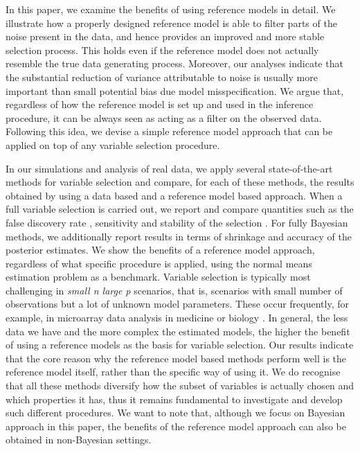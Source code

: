 \documentclass[american,]{article}
\theoremstyle{definition}
\begin{document}
In this paper, we examine the benefits of using reference
models in detail. We illustrate how a properly designed reference model is able 
to filter parts of the noise present in the data, and hence provides an improved and more
stable selection process. This holds even if the reference model does not actually resemble the
true data generating process. Moreover, our analyses indicate that the substantial reduction of
variance attributable to noise is usually
more important than small potential bias due model misspecification.
We argue that, regardless of how the reference model is set up and used in the
inference procedure, it can be always seen as acting as a filter on the observed 
data. Following this idea, we devise a simple reference model approach that can
be applied on top of any variable selection procedure. 

In our simulations and analysis of real data, we apply several state-of-the-art methods for variable selection and compare,
for each of these methods, the results obtained by using a data based and a
reference model based approach. When a full 
variable selection is carried out, we report and compare quantities such as 
the false discovery rate \citep{paper:fdr_BH}, sensitivity and stability of the selection \citep{paper:stability}. For fully Bayesian methods, we additionally report results in terms of shrinkage and accuracy of the posterior estimates.
We show the benefits
of a reference model approach, regardless of what specific procedure is applied, using 
the normal means estimation problem as a benchmark. 
Variable selection is typically most challenging in 
\textit{small n large p} scenarios, that is, scenarios with small number of
observations but a lot of unknown model parameters. 
These occur frequently, for example, 
in microarray data analysis in medicine or biology \citep{dudoit2003multiple,liao2007logistic,paper:efron}.
In general, the less data we have and the more complex 
the estimated models, the higher the benefit of using a reference
models as the basis for variable selection.
Our results indicate that the core reason why the reference model based
methods perform well is the reference model itself, rather than the
specific way of using it. We do recognise that all these methods
diversify how the subset of variables is actually chosen and which
properties it has, thus it remains fundamental to investigate and
develop such different procedures. We want to note that, although we focus on
Bayesian approach in this paper, the benefits of the reference model 
approach can also be obtained in non-Bayesian settings.
\end{document}

